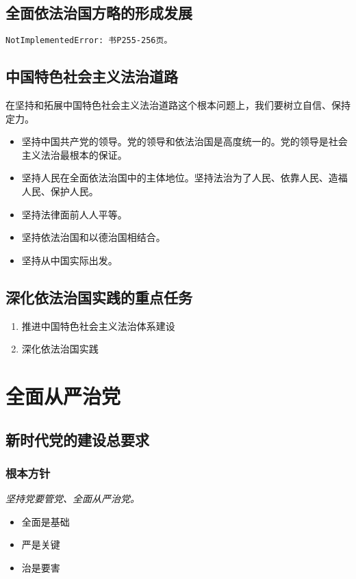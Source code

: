     \subsection{全面依法治国方略的形成发展}
        \verb|NotImplementedError: 书P255-256页。|

    \subsection{中国特色社会主义法治道路}
        在坚持和拓展中国特色社会主义法治道路这个根本问题上，我们要树立自信、保持定力。
        \begin{itemize}
            \item 坚持中国共产党的领导。党的领导和依法治国是高度统一的。党的领导是社会主义法治最根本的保证。
            \item 坚持人民在全面依法治国中的主体地位。坚持法治为了人民、依靠人民、造福人民、保护人民。
            \item 坚持法律面前人人平等。
            \item 坚持依法治国和以德治国相结合。
            \item 坚持从中国实际出发。
        \end{itemize}

    \subsection{深化依法治国实践的重点任务}
        \begin{enumerate}
            \item 推进中国特色社会主义法治体系建设
            \item 深化依法治国实践
        \end{enumerate}


\section{全面从严治党}
    \subsection{新时代党的建设总要求}
        \subsubsection{根本方针}
        \emph{坚持党要管党、全面从严治党。}
        \begin{itemize}
            \item 全面是基础
            \item 严是关键
            \item 治是要害
        \end{itemize}

